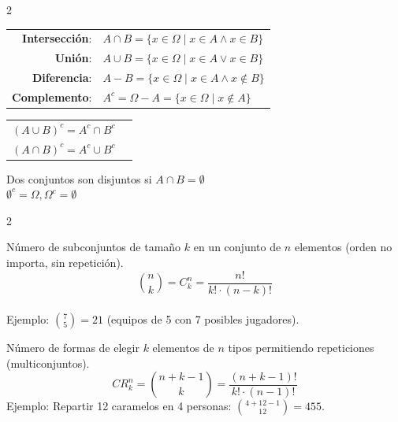 \documentclass[10pt,a4paper]{article}
\begin{document}
\begin{multicols}{2}
    \begin{tcolorbox}[title=Operaciones Básicas]
        \begin{tabular}{rl}
            \textbf{Intersección}: & $A \cap B = \{ x \in \Omega \mid x \in A \land x \in B \}$ \\
            \textbf{Unión}: & $A \cup B = \{ x \in \Omega \mid x \in A \lor x \in B \}$ \\
            \textbf{Diferencia}: & $A - B = \{x \in \Omega \mid x \in A \land x \notin B \}$ \\
            \textbf{Complemento}: & $A^c = \Omega - A = \{x \in \Omega \mid x \notin A \}$
        \end{tabular}
    \end{tcolorbox}
    \begin{tcolorbox}[title=Leyes de De Morgan]
        \begin{tabular}{rl}
            ${\left( A \cup B \right)}^c = A^c \cap B^c$ \\
            ${\left( A \cap B \right)}^c = A^c \cup B^c$
        \end{tabular}
    \end{tcolorbox}
    \begin{tcolorbox}[title=Propiedades adicionales]
        Dos conjuntos son disjuntos si $A \cap B = \emptyset$ \\
        $\emptyset^c = \Omega, \Omega^c = \emptyset$
    \end{tcolorbox}
\end{multicols}


\begin{multicols}{2}
    \begin{tcolorbox}[title=Número Binomial (Combinaciones sin Repetición), equal height group=COMB1]
        Número de subconjuntos de tamaño \( k \) en un conjunto de \( n \) elementos (orden no importa, sin repetición).
        \[
            \binom{n}{k} = C_k^n = \frac{n!}{k! \cdot (n-k)!}
        \] \\
        Ejemplo: \( \binom{7}{5} = 21 \) (equipos de 5 con 7 posibles jugadores).
    \end{tcolorbox}
    \begin{tcolorbox}[title=Número Binomial (Combinaciones sin Repetición), equal height group=COMB1]
        Número de formas de elegir \( k \) elementos de \( n \) tipos permitiendo repeticiones (multiconjuntos).
        \[
            CR_k^n = \binom{n + k - 1}{k} = \frac{(n + k - 1)!}{k! \cdot (n-1)!}
        \]
        Ejemplo: Repartir 12 caramelos en 4 personas: \( \binom{4 + 12 - 1}{12} = 455 \).
    \end{tcolorbox}
\end{multicols}
\end{document}
